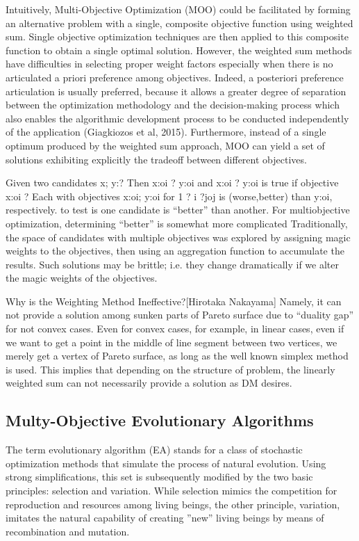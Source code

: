             Intuitively, Multi-Objective Optimization (MOO) could be
            facilitated by forming an alternative problem with a single,
            composite objective function using weighted sum. Single
            objective optimization techniques are then applied to this
            composite function to obtain a single optimal solution.
            However, the weighted sum methods have difficulties in
            selecting proper weight factors especially when there is no
            articulated a priori preference among objectives. Indeed, a
            posteriori preference articulation is usually preferred, because it
            allows a greater degree of separation between the optimization
            methodology and the decision-making process which also
            enables the algorithmic development process to be conducted
            independently of the application (Giagkiozos et al, 2015).
            Furthermore, instead of a single optimum produced by the
            weighted sum approach, MOO can yield a set of solutions
            exhibiting explicitly the tradeoff between different objectives. \cite{DBLP:journals/corr/abs-1812-07958}


            Given two candidates x; y:? Then x:oi ? y:oi and x:oi ? y:oi is true if objective x:oi ? 
            Each with objectives x:oi; y:oi for 1 ? i ?joj is (worse,better) than y:oi, respectively. to test is one candidate is “better” than another. 
            For multiobjective optimization, determining “better” is somewhat more complicated Traditionally, the space of candidates 
            with multiple objectives was explored by assigning magic weights to the objectives, then using an aggregation function to 
            accumulate the results. Such solutions may be brittle; i.e. they change dramatically if we alter the magic weights of the objectives.

            Why is the Weighting Method Ineffective?[Hirotaka Nakayama]
            Namely, it can not provide a solution among sunken parts of Pareto surface due to “duality gap” for not convex cases. 
            Even for convex cases, for example, in linear cases, even if we want to get a point in the middle of line segment between two vertices, we merely get a vertex of Pareto surface, as
            long as the well known simplex method is used. This implies that depending on the structure of problem, the linearly weighted sum can not necessarily provide a solution as DM desires.


        \subsection{Multy-Objective Evolutionary Algorithms}
            The term evolutionary algorithm (EA) stands for a class of stochastic optimization methods that simulate the process of natural evolution.
            Using strong simplifications, this set is subsequently modified by the two basic principles: selection and variation.
            While selection mimics the competition for reproduction and resources among living beings, the other principle, variation, imitates the natural capability of creating ”new” living beings by means of recombination and mutation. 

